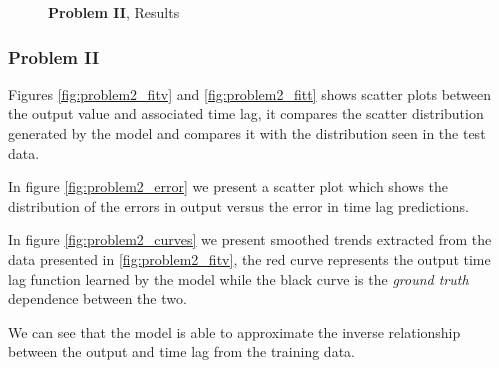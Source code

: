 \documentclass[envcountsect,runningheads]{llncs}
\theoremstyle{etoile}
\begin{document}
\begin{figure}
  \caption{\textbf{Problem II}, Results}
\end{figure}




\subsubsection{Problem II}

Figures \ref{fig:problem2_fitv} and \ref{fig:problem2_fitt} shows scatter plots between the output value and associated 
time lag, it compares the scatter distribution generated by the model and compares it with the 
distribution seen in the test data.

In figure \ref{fig:problem2_error} we present a scatter plot which shows the distribution of the 
errors in output versus the error in time lag predictions.

In figure \ref{fig:problem2_curves} we present smoothed trends extracted from the data presented in 
\ref{fig:problem2_fitv}, the red curve represents the output time lag function learned by the model 
while the black curve is the \emph{ground truth} dependence between the two. 

We can see that the model is able to approximate the inverse relationship between the output and 
time lag from the training data.
\end{document}
